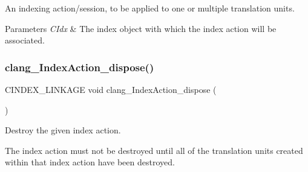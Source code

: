 An indexing action/session, to be applied to one or multiple translation units. 


\begin{DoxyParams}{Parameters}
{\em C\+Idx} & The index object with which the index action will be associated. \\
\hline
\end{DoxyParams}
\mbox{\label{group__CINDEX__HIGH_ga9b648aa6e87ea8d29dd0d4f0f592ffbb}} 
\subsubsection{\texorpdfstring{clang\+\_\+\+Index\+Action\+\_\+dispose()}{clang\_IndexAction\_dispose()}}
{\footnotesize\ttfamily C\+I\+N\+D\+E\+X\+\_\+\+L\+I\+N\+K\+A\+GE void clang\+\_\+\+Index\+Action\+\_\+dispose (\begin{DoxyParamCaption}\item[{\mbox{\hyperlink{group__CINDEX__HIGH_gac8d30d3e3fb34d887b611e7c6de3afb6}{C\+X\+Index\+Action}}}]{ }\end{DoxyParamCaption})}



Destroy the given index action. 

The index action must not be destroyed until all of the translation units created within that index action have been destroyed. \mbox{\label{group__CINDEX__HIGH_ga340d2dda7a0d3430fe9929034c1b712c}} 
